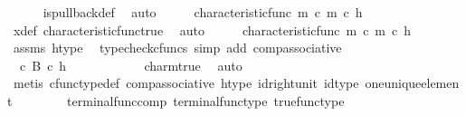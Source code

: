 \begin{isabellebody}
\ \ \ \ \isamarkupfalse%
\ is{\isacharunderscore}{\kern0pt}pullback{\isacharunderscore}{\kern0pt}def\ \isamarkupfalse%
\ auto\isanewline
\isanewline
\ \ \isamarkupfalse%
\ \isamarkupfalse%
\ {\isachardoublequoteopen}characteristic{\isacharunderscore}{\kern0pt}func\ m\ {\isasymcirc}\isactrlsub c\ m\ {\isasymcirc}\isactrlsub c\ h\ {\isacharequal}{\kern0pt}\ {\isasymf}{\isachardoublequoteclose}\isanewline
\ \ \ \ \isamarkupfalse%
\ x{\isacharunderscore}{\kern0pt}def\ characteristic{\isacharunderscore}{\kern0pt}func{\isacharunderscore}{\kern0pt}true\ \isamarkupfalse%
\ auto\isanewline
\ \ \isamarkupfalse%
\ \isamarkupfalse%
\ {\isachardoublequoteopen}{\isacharparenleft}{\kern0pt}characteristic{\isacharunderscore}{\kern0pt}func\ m\ {\isasymcirc}\isactrlsub c\ m{\isacharparenright}{\kern0pt}\ {\isasymcirc}\isactrlsub c\ h\ {\isacharequal}{\kern0pt}\ {\isasymf}{\isachardoublequoteclose}\isanewline
\ \ \ \ \isamarkupfalse%
\ assms\ h{\isacharunderscore}{\kern0pt}type\ \isamarkupfalse%
\ {\isacharparenleft}{\kern0pt}typecheck{\isacharunderscore}{\kern0pt}cfuncs{\isacharcomma}{\kern0pt}\ simp\ add{\isacharcolon}{\kern0pt}\ comp{\isacharunderscore}{\kern0pt}associative{}{\isacharparenright}{\kern0pt}\isanewline
\ \ \isamarkupfalse%
\ \isamarkupfalse%
\ {\isachardoublequoteopen}{\isacharparenleft}{\kern0pt}{\isasymt}\ {\isasymcirc}\isactrlsub c\ {\isasymbeta}\isactrlbsub B\isactrlesub {\isacharparenright}{\kern0pt}\ {\isasymcirc}\isactrlsub c\ h\ {\isacharequal}{\kern0pt}\ {\isasymf}{\isachardoublequoteclose}\ \ \ \ \isanewline
\ \ \ \ \isamarkupfalse%
\ char{\isacharunderscore}{\kern0pt}m{\isacharunderscore}{\kern0pt}true\ \isamarkupfalse%
\ auto\isanewline
\ \ \isamarkupfalse%
\ \isamarkupfalse%
\ {\isachardoublequoteopen}{\isasymt}\ {\isacharequal}{\kern0pt}\ {\isasymf}{\isachardoublequoteclose}\isanewline
\ \ \ \ \isamarkupfalse%
\ {\isacharparenleft}{\kern0pt}metis\ cfunc{\isacharunderscore}{\kern0pt}type{\isacharunderscore}{\kern0pt}def\ comp{\isacharunderscore}{\kern0pt}associative\ h{\isacharunderscore}{\kern0pt}type\ id{\isacharunderscore}{\kern0pt}right{\isacharunderscore}{\kern0pt}unit{}\ id{\isacharunderscore}{\kern0pt}type\ one{\isacharunderscore}{\kern0pt}unique{\isacharunderscore}{\kern0pt}element\isanewline
\ \ \ \ \ \ \ \ terminal{\isacharunderscore}{\kern0pt}func{\isacharunderscore}{\kern0pt}comp\ terminal{\isacharunderscore}{\kern0pt}func{\isacharunderscore}{\kern0pt}type\ true{\isacharunderscore}{\kern0pt}func{\isacharunderscore}{\kern0pt}type{\isacharparenright}{\kern0pt}\isanewline

\end{isabellebody}
